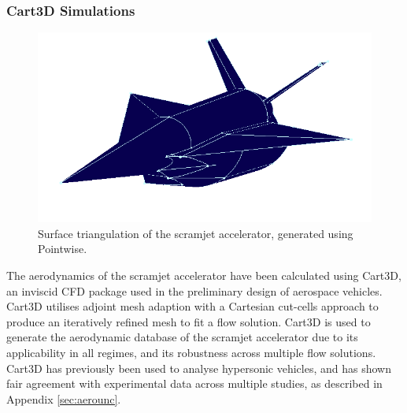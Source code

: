 \subsubsection{Cart3D Simulations}\label{sec:cart3d}
\begin{figure}[ht]
	\centering
	\includegraphics[width=0.6\linewidth]{figures/3_vehicle_design/Pointwise}
	\caption{Surface triangulation of the scramjet accelerator, generated using Pointwise\cite{Pointwise}.}
	\label{fig:Pointwise}
\end{figure}
\noindent
The aerodynamics of the scramjet accelerator have been calculated using Cart3D, an inviscid CFD package used in the preliminary design of aerospace vehicles. Cart3D utilises adjoint mesh adaption with a Cartesian cut-cells approach to produce an iteratively refined mesh to fit a flow solution. Cart3D is used to generate the aerodynamic database of the scramjet accelerator due to its applicability in all regimes, and its robustness across multiple flow solutions\cite{Sagerman2017,Abeynayake,Aftosmis2011,Almosnino2016a,Gomez2004,Ward2018,Kiris2011}. Cart3D has previously been used to
analyse hypersonic vehicles, and has shown fair agreement with experimental data across multiple studies\cite{Abeynayake2013a,Ward2018,Kiris2011}, as described in Appendix \textcolor{black}{\ref{sec:aerounc}}.

